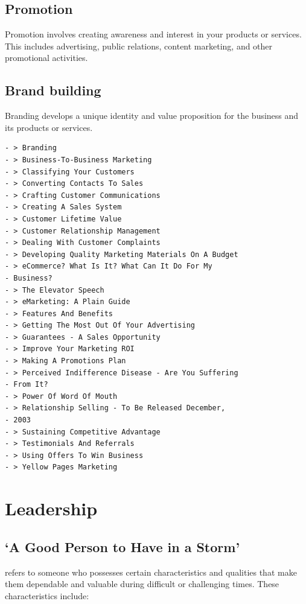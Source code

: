 \documentclass[
]{book}
\begin{document}
\hypertarget{promotion}{%
\section{Promotion}\label{promotion}}

Promotion involves creating awareness and interest in your products or services. This includes advertising, public relations, content marketing, and other promotional activities.

\hypertarget{brand-building}{%
\section{Brand building}\label{brand-building}}

Branding develops a unique identity and value proposition for the business and its products or services.

\begin{verbatim}
- > Branding
- > Business-To-Business Marketing
- > Classifying Your Customers
- > Converting Contacts To Sales
- > Crafting Customer Communications
- > Creating A Sales System
- > Customer Lifetime Value
- > Customer Relationship Management
- > Dealing With Customer Complaints
- > Developing Quality Marketing Materials On A Budget
- > eCommerce? What Is It? What Can It Do For My
- Business?
- > The Elevator Speech
- > eMarketing: A Plain Guide
- > Features And Benefits
- > Getting The Most Out Of Your Advertising
- > Guarantees - A Sales Opportunity
- > Improve Your Marketing ROI
- > Making A Promotions Plan
- > Perceived Indifference Disease - Are You Suffering
- From It?
- > Power Of Word Of Mouth
- > Relationship Selling - To Be Released December,
- 2003
- > Sustaining Competitive Advantage
- > Testimonials And Referrals
- > Using Offers To Win Business
- > Yellow Pages Marketing
\end{verbatim}

\hypertarget{leadership}{%
\chapter{Leadership}\label{leadership}}

\hypertarget{a-good-person-to-have-in-a-storm}{%
\section{`A Good Person to Have in a Storm'}\label{a-good-person-to-have-in-a-storm}}

refers to someone who possesses certain characteristics and qualities that make them dependable and valuable during difficult or challenging times. These characteristics include:
\end{document}
